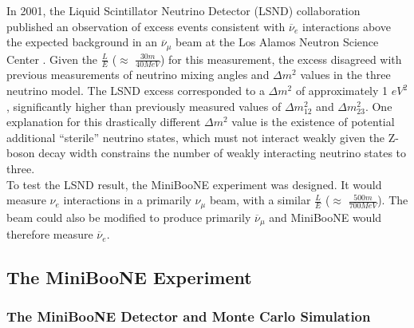 In 2001, the Liquid Scintillator Neutrino Detector (LSND) collaboration published an observation of excess events consistent with $\overline{\nu}_e$ interactions above the expected background in an $\overline{\nu}_\mu$ beam at the Los Alamos Neutron Science Center \cite{LSNDPaper}. Given the $\frac{L}{E}$ ($\approx$ $\frac{30 m}{40 MeV}$) for this measurement, the excess disagreed with previous measurements of neutrino mixing angles and $\Delta m^2$ values in the three neutrino model. The LSND excess corresponded to a $\Delta m^2$ of approximately 1 $eV^2$, significantly higher than previously measured values of $\Delta m_{12}^2$ and $\Delta m_{23}^2$. One explanation for this drastically different $\Delta m^2$ value is the existence of potential additional ``sterile'' neutrino states, which must not interact weakly given the Z- boson decay width constrains the number of weakly interacting neutrino states to three.\\
To test the LSND result, the MiniBooNE experiment was designed. It would measure $\nu_e$ interactions in a primarily $\nu_\mu$ beam, with a similar $\frac{L}{E}$ ($\approx$ $\frac{500m}{700 MeV}$). The beam could also be modified to produce primarily $\overline{\nu}_\mu$ and MiniBooNE would therefore measure $\overline{\nu}_e$.



\subsection{The MiniBooNE Experiment}

\subsubsection{The MiniBooNE Detector and Monte Carlo Simulation}



